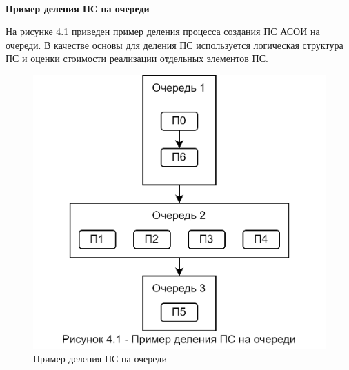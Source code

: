 \documentclass[12pt, a4paper, simple]{eskdtext}
\begin{document}
    \paragraph{} \textbf{Пример деления ПС на очереди}

    На рисунке 4.1 приведен пример деления процесса создания ПС АСОИ на очереди.
    В качестве основы для деления ПС используется логическая структура ПС и оценки стоимости реализации отдельных элементов ПС.

    \begin{figure}[ph!]
        \centering
        \includegraphics[]
            {_docs/Рисунок4-1ПримерДеленияПСНаОчереди.png}
        \caption{Пример деления ПС на очереди}
    \end{figure}
    
\end{document}
